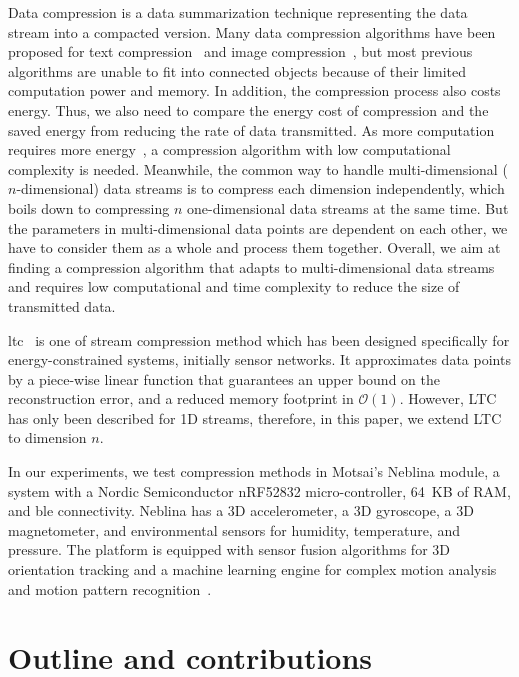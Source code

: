 Data compression is a data summarization technique representing the data stream
into a compacted version. Many data compression algorithms have been proposed
for text compression~\cite{shanmugasundaram2011comparative,
sayood2017introduction} and image compression~\cite{shum2003survey,
zaineldin2015image}, but most previous algorithms are unable to fit into
connected objects because of their limited computation power and memory. In
addition, the compression process also costs energy. Thus, we also need to
compare the energy cost of compression and the saved energy from reducing the
rate of data transmitted. As more computation requires more
energy~\cite{pope2018accelerometer}, a compression algorithm with low
computational complexity is needed. Meanwhile, the common way to handle
multi-dimensional ($n$-dimensional) data streams is to compress each dimension
independently, which boils down to compressing $n$ one-dimensional data streams
at the same time. But the parameters in multi-dimensional data points are
dependent on each other, we have to consider them as a whole and process them
together. Overall, we aim at finding a compression algorithm that adapts to
multi-dimensional data streams and requires low computational and time
complexity to reduce the size of transmitted data.

\acrfull{ltc}~\cite{schoellhammer2004lightweight} is one of stream compression
method which has been designed specifically for energy-constrained systems,
initially sensor networks. It approximates data points by a piece-wise linear
function that guarantees an upper bound on the reconstruction error, and a
reduced memory footprint in $\mathcal{O}(1)$. However, LTC has only been
described for 1D streams, therefore, in this paper, we extend LTC to dimension
$n$.

In our experiments, we test compression methods in Motsai's Neblina module, a
system with a Nordic Semiconductor nRF52832 micro-controller, 64~KB of RAM, and
\acrlong{ble} connectivity. Neblina has a 3D accelerometer, a 3D gyroscope, a 3D
magnetometer, and environmental sensors for humidity, temperature, and pressure.
The platform is equipped with sensor fusion algorithms for 3D orientation
tracking and a machine learning engine for complex motion analysis and motion
pattern recognition~\cite{sarbishei2016accuracy}.


\section{Outline and contributions}


